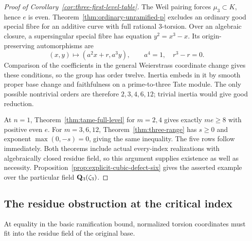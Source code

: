 \begin{proof}[Proof of Corollary~\ref{cor:three-first-level-table}]
The Weil pairing forces $\mu_3\subset K$, hence $e$ is even. Theorem~\ref{thm:ordinary-unramified-p} excludes an ordinary good special fibre for an additive curve with full rational $3$-torsion. Over an algebraic closure, a supersingular special fibre has equation $y^2=x^3-x$. Its origin-preserving automorphisms are
\[
 (x,y)\longmapsto(a^2x+r,a^3y),\qquad a^4=1,\quad r^3-r=0.
\]
Comparison of the coefficients in the general Weierstrass coordinate change gives these conditions, so the group has order twelve. Inertia embeds in it by smooth proper base change and faithfulness on a prime-to-three Tate module. The only possible nontrivial orders are therefore $2,3,4,6,12$; trivial inertia would give good reduction.

At $n=1$, Theorem~\ref{thm:tame-full-level} for $m=2,4$ gives exactly $me\ge8$ with positive even $e$. For $m=3,6,12$, Theorem~\ref{thm:three-range} has $s\ge0$ and exponent $\max(0,-s)=0$, giving the same inequality. The five rows follow immediately. Both theorems include actual every-index realizations with algebraically closed residue field, so this argument supplies existence as well as necessity. Proposition~\ref{prop:explicit-cubic-defect-six} gives the asserted example over the particular field $\mathbf Q_3(\zeta_3)$.
\end{proof}

\subsection{The residue obstruction at the critical index}
At equality in the basic ramification bound, normalized torsion coordinates must fit into the residue field of the original base.

